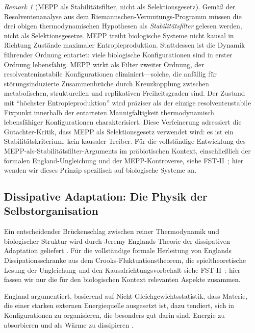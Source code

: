 \documentclass[12pt,a4paper]{article}
\theoremstyle{remark}
\newtheorem{remark}{Remark}
\begin{document}
\begin{remark}[MEPP als Stabilit\"atsfilter, nicht als Selektionsgesetz]
\label{rem:mepp-stability-biology}
Gem\"a\ss{} der Resolventenanalyse aus dem Riemannschen-Vermutungs-Programm \citep{GeigerRH2026b} m\"ussen die drei obigen thermodynamischen Hypothesen als \emph{Stabilit\"atsfilter} gelesen werden, nicht als Selektionsgesetze. MEPP treibt biologische Systeme nicht kausal in Richtung Zust\"ande maximaler Entropieproduktion. Stattdessen ist die Dynamik f\"uhrender Ordnung entartet: viele biologische Konfigurationen sind in erster Ordnung lebensfähig. MEPP wirkt als Filter zweiter Ordnung, der resolventeninstabile Konfigurationen eliminiert---solche, die anf\"allig f\"ur st\"orungsinduzierte Zusammenbr\"uche durch Kreuzkopplung zwischen metabolischen, strukturellen und replikativen Freiheitsgraden sind. Der Zustand mit ``h\"ochster Entropieproduktion'' wird pr\"aziser als der einzige resolventenstabile Fixpunkt innerhalb der entarteten Mannigfaltigkeit thermodynamisch lebensfähiger Konfigurationen charakterisiert. Diese Verfeinerung adressiert die Gutachter-Kritik, dass MEPP als Selektionsgesetz verwendet wird: es ist ein Stabilit\"atskriterium, kein kausaler Treiber. F\"ur die vollst\"andige Entwicklung des MEPP-als-Stabilit\"atsfilter-Arguments im pr\"abiotischen Kontext, einschlie\ss{}lich der formalen England-Ungleichung und der MEPP-Kontroverse, siehe FST-II~\citep{FSTII}; hier wenden wir dieses Prinzip spezifisch auf biologische Systeme an.
\end{remark}

\subsection{Dissipative Adaptation: Die Physik der Selbstorganisation}

Ein entscheidender Br\"uckenschlag zwischen reiner Thermodynamik und biologischer Struktur wird durch Jeremy Englands Theorie der dissipativen Adaptation geliefert \citep{England2013,EnglandNano}. F\"ur die vollst\"andige formale Herleitung von Englands Dissipationsschranke aus dem Crooks-Fluktuationstheorem, die spieltheoretische Lesung der Ungleichung und den Kausalrichtungsvorbehalt siehe FST-II~\citep{FSTII}; hier fassen wir nur die f\"ur den biologischen Kontext relevanten Aspekte zusammen.

England argumentiert, basierend auf Nicht-Gleichgewichtsstatistik, dass Materie, die einer starken externen Energiequelle ausgesetzt ist, dazu tendiert, sich in Konfigurationen zu organisieren, die besonders gut darin sind, Energie zu absorbieren und als W\"arme zu dissipieren \citep{England2013}.
\end{document}
